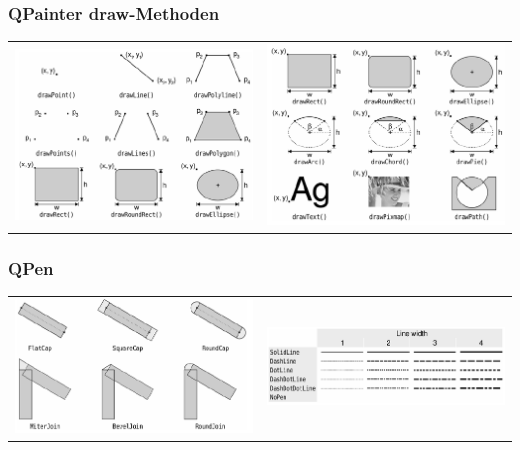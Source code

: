 \subsubsection{QPainter draw-Methoden}
\begin{tabular}{c c}%
	\includegraphics[width=9cm]{images/draw_1.png}& \includegraphics[width=9cm]{images/draw_2.png}\\
\end{tabular}
\subsubsection{QPen}
\begin{tabular}{c c}
	\includegraphics[width=9cm]{images/pen_1.png}& \includegraphics[width=9cm]{images/pen_2.png}\\
\end{tabular}

